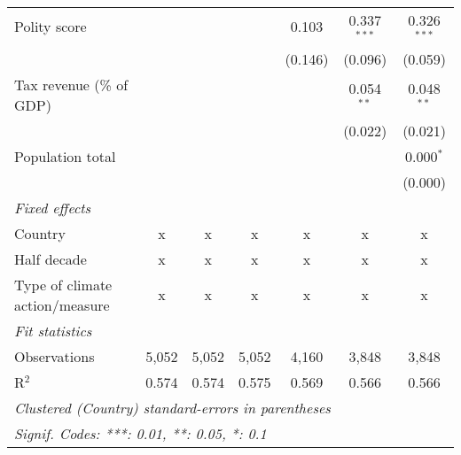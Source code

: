 \begin{tabular}{lcccccc}
   Polity score                                                      &         &         &                & 0.103          & 0.337$^{***}$  & 0.326$^{***}$\\   
                                                                     &         &         &                & (0.146)        & (0.096)        & (0.059)\\   
   Tax revenue (\% of GDP)                                           &         &         &                &                & 0.054$^{**}$   & 0.048$^{**}$\\   
                                                                     &         &         &                &                & (0.022)        & (0.021)\\   
   Population total                                                  &         &         &                &                &                & 0.000$^{*}$\\   
                                                                     &         &         &                &                &                & (0.000)\\   
   \emph{Fixed effects}\\
   Country                                                           & x       & x       & x              & x              & x              & x\\  
   Half decade                                                       & x       & x       & x              & x              & x              & x\\  
   Type of climate action/measure                                    & x       & x       & x              & x              & x              & x\\  
   \midrule \emph{Fit statistics}\\
   Observations                                                      & 5,052   & 5,052   & 5,052          & 4,160          & 3,848          & 3,848\\  
   R$^2$                                                             & 0.574   & 0.574   & 0.575          & 0.569          & 0.566          & 0.566\\  
   \midrule
   \multicolumn{7}{l}{\emph{Clustered (Country) standard-errors in parentheses}}\\
   \multicolumn{7}{l}{\emph{Signif. Codes: ***: 0.01, **: 0.05, *: 0.1}}\\
\end{tabular}
\par\endgroup



